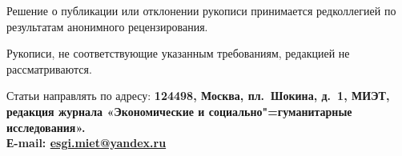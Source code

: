 \begin{multicols}{2}
Решение о публикации или отклонении рукописи принимается редколлегией
по результатам анонимного рецензирования.

Рукописи, не соответствующие указанным требованиям, редакцией не рассматриваются.

\begin{flushleft}
    Статьи направлять по адресу: \bfseries 124498,
    Москва, пл. Шокина, д. 1, МИЭТ,
    редакция журнала «Экономические
    и социально"=гуманитарные исследования».\\
    Е-mail: \href{mailto:esgi.miet@yandex.ru}{esgi.miet@yandex.ru} \par
\end{flushleft}

\end{multicols}

\setmainlinespread

\label{authors:end}